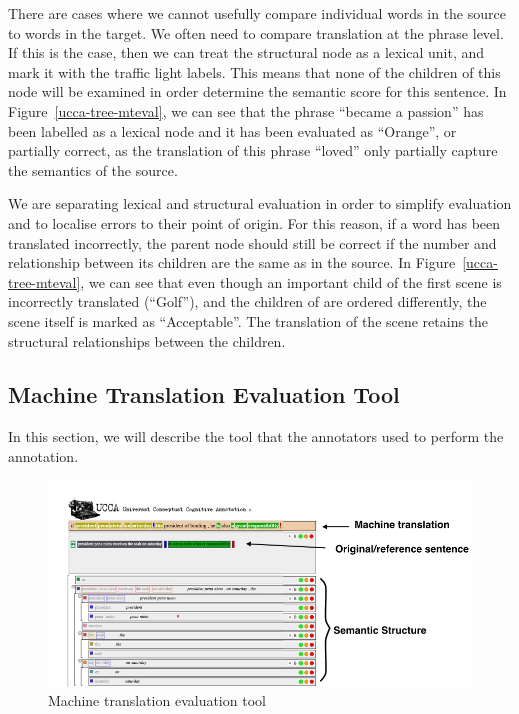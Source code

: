 \documentclass[11pt]{article}
\begin{document}

There are cases where we cannot usefully compare individual words in the source to words in the target.
We often need to compare translation at the phrase level. If this is the case, then we can 
 treat the structural node as a lexical unit, and mark it with the traffic light labels. This 
means that none of the children of this node will be examined in order determine the semantic score
for this sentence. 
In Figure~\ref{ucca-tree-mteval}, we can see that the phrase ``became a passion'' has been labelled as a lexical
node and it has been evaluated as ``Orange'', or partially correct, as the translation of this phrase ``loved'' 
only partially capture the semantics of the source.

We are separating lexical and structural evaluation in order to simplify evaluation and to localise errors
to their point of origin. For this reason, if a word has been translated incorrectly,
the parent node should still be correct if the number and relationship between its children are the same
as in the source. 
In Figure~\ref{ucca-tree-mteval}, we can see that even though an important child of the first scene is 
incorrectly translated (``Golf''), and the children of are ordered differently, 
the scene itself is marked as ``Acceptable''. The translation of the scene retains the structural 
relationships between the children.
\\

\newpage

\subsection{Machine Translation Evaluation Tool}

In this section, we will describe the tool that the annotators used to perform the annotation. 

\begin{figure}[t]
    \includegraphics[width=1\textwidth]{interface-annotations}
    \caption{Machine translation evaluation tool}
    \label{mttool}
\end{figure}
\end{document}
